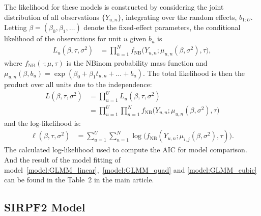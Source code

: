 \documentclass[aoas,preprint]{imsart}\usepackage[]{graphicx}\usepackage[]{xcolor}
\newcommand\Unit{U}
\newcommand\unit{u}
\newcommand\benchmarktime{n}
\begin{document}
The likelihood for these models is constructed by considering the joint distribution of all observations $\{Y_{u,n}\}$, integrating over the random effects, $b_{1:\Unit}$. Letting $\beta = (\beta_0, \beta_1, \dots)$ denote the fixed-effect parameters, the conditional likelihood of the observations for unit $\unit$ given $b_\unit$ is
\begin{align}
L_\unit(\beta, \tau, \sigma^2) &= \prod_{\benchmarktime=1}^{N} f_{\text{NB}}\bigl(Y_{\unit,\benchmarktime}; \mu_{\unit,\benchmarktime}(\beta, \sigma^2), \tau\bigr),
\label{eq:conditional_likelihood}
\end{align}
where $f_{\text{NB}}(\cdot;\mu,\tau)$ is the NBinom probability mass function and $\mu_{\unit,\benchmarktime}(\beta, b_\unit) = \exp(\beta_0 + \beta_1 t_{\unit,\benchmarktime} + \dots + b_\unit)$. 
The total likelihood is then the product over all units due to the independence:
\begin{align}
L(\beta, \tau, \sigma^2) &= \prod_{\unit=1}^{\Unit} L_\unit(\beta, \tau, \sigma^2)\\
                         &= \prod_{\unit=1}^{\Unit} \prod_{\benchmarktime=1}^{N} f_{\text{NB}}\bigl(Y_{\unit,\benchmarktime}; \mu_{\unit,\benchmarktime}(\beta, \sigma^2), \tau\bigr)
\label{eq:total_likelihood}
\end{align}
and the log-likelihood is:
\begin{align}
\ell(\beta, \tau, \sigma^2) &= \sum_{\unit=1}^{\Unit} \sum_{\benchmarktime=1}^{N} \log \bigl(f_{\text{NB}}(Y_{\unit,\benchmarktime}; \mu_{i,j}(\beta, \sigma^2), \tau)\bigl).
\label{eq:log_likelihood}
\end{align}
The calculated log-likelihood used to compute the AIC for model comparison. And the result of the model fitting of model~\ref{model:GLMM_linear},~\ref{model:GLMM_quad} and \ref{model:GLMM_cubic} can be found in the Table~2 in the main article.

\subsection{SIRPF2 Model}
\end{document}

